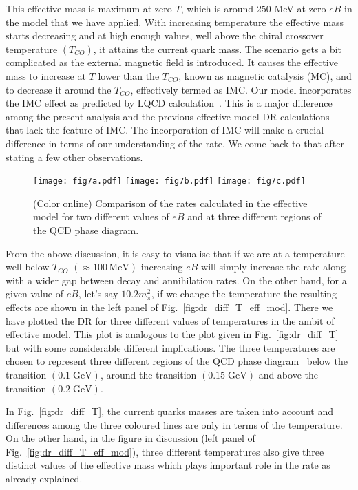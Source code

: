 \documentclass[aps,prd,floatfix,showpacs,showkeys,superscriptadress,unsortedaddress,nofootinbib,onecolumn]{revtex4-1}
\begin{document}
This effective mass is maximum at zero $T$, which is around $250$ MeV at zero $eB$ in the model that we have applied. With increasing temperature the effective mass starts decreasing and at high enough values, well above the chiral crossover temperature $(T_{CO})$, it attains the current quark mass.  The scenario gets a bit complicated as the external magnetic field is introduced. It causes the effective mass to increase at $T$ lower than the $T_{CO}$, known as magnetic catalysis (MC), and to decrease it around the $T_{CO}$, effectively termed as IMC. Our model incorporates the IMC effect as predicted by LQCD calculation~\cite{Bali:2012zg,Bali:2011qj}. This is a major difference among the present analysis and the previous effective model DR calculations~\cite{Ghosh:2020xwp,Chaudhuri:2021skc} that lack the feature of IMC. The incorporation of IMC will make a crucial difference in terms of our understanding of the rate. We come back to that after stating a few other observations.
\begin{figure}
\begin{center}
\texttt{[image: fig7a.pdf]}
\texttt{[image: fig7b.pdf]}
\texttt{[image: fig7c.pdf]}
\caption{(Color online) Comparison of the rates calculated in the effective model for two different values of $eB$ and at three different regions of the QCD phase diagram.}
\label{fig:dr_diff_T_n_eB_eff_mod}
\end{center}
\end{figure}

From the above discussion, it is easy to visualise that if we are at a temperature well below $T_{CO}$ $(\approx 100\, \mathrm{MeV})$ increasing $eB$ will simply increase the rate along with a wider gap between decay and annihilation rates. On the other hand, for a given value of $eB$, let's say $10.2 m_\pi^2$, if we change the temperature the resulting effects are shown in the left panel of Fig.~\ref{fig:dr_diff_T_eff_mod}. There we have plotted the DR for three different values of temperatures in the ambit of effective model. This plot is analogous to the plot given in Fig.~\ref{fig:dr_diff_T} but with some considerable different implications. The three temperatures are chosen to represent three different regions of the QCD phase diagram \textemdash\, below the transition $(0.1\;{\mathrm{GeV}})$, around the transition $(0.15\;{\mathrm{GeV}})$ and above the transition $(0.2\;{\mathrm{GeV}})$.

In Fig.~\ref{fig:dr_diff_T}, the current quarks masses are taken into account and differences among the three coloured lines are only in terms of the temperature. On the other hand, in the figure in discussion (left panel of Fig.~\ref{fig:dr_diff_T_eff_mod}), three different temperatures also give three distinct values of the effective mass which plays important role in the rate as already explained.
\end{document}
